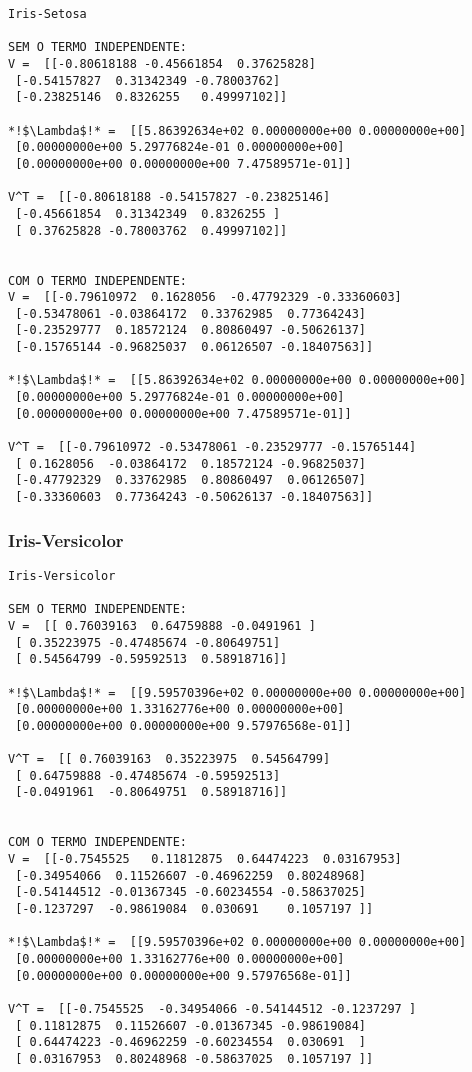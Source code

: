 \documentclass[a4paper,12pt,twoside]{article}
\begin{document}
\begin{lstlisting}
Iris-Setosa

SEM O TERMO INDEPENDENTE: 
V =  [[-0.80618188 -0.45661854  0.37625828]
 [-0.54157827  0.31342349 -0.78003762]
 [-0.23825146  0.8326255   0.49997102]]

*!$\Lambda$!* =  [[5.86392634e+02 0.00000000e+00 0.00000000e+00]
 [0.00000000e+00 5.29776824e-01 0.00000000e+00]
 [0.00000000e+00 0.00000000e+00 7.47589571e-01]]

V^T =  [[-0.80618188 -0.54157827 -0.23825146]
 [-0.45661854  0.31342349  0.8326255 ]
 [ 0.37625828 -0.78003762  0.49997102]]


COM O TERMO INDEPENDENTE: 
V =  [[-0.79610972  0.1628056  -0.47792329 -0.33360603]
 [-0.53478061 -0.03864172  0.33762985  0.77364243]
 [-0.23529777  0.18572124  0.80860497 -0.50626137]
 [-0.15765144 -0.96825037  0.06126507 -0.18407563]]

*!$\Lambda$!* =  [[5.86392634e+02 0.00000000e+00 0.00000000e+00]
 [0.00000000e+00 5.29776824e-01 0.00000000e+00]
 [0.00000000e+00 0.00000000e+00 7.47589571e-01]]

V^T =  [[-0.79610972 -0.53478061 -0.23529777 -0.15765144]
 [ 0.1628056  -0.03864172  0.18572124 -0.96825037]
 [-0.47792329  0.33762985  0.80860497  0.06126507]
 [-0.33360603  0.77364243 -0.50626137 -0.18407563]]

\end{lstlisting}

\subsubsection{Iris-Versicolor}

\begin{lstlisting}
Iris-Versicolor

SEM O TERMO INDEPENDENTE: 
V =  [[ 0.76039163  0.64759888 -0.0491961 ]
 [ 0.35223975 -0.47485674 -0.80649751]
 [ 0.54564799 -0.59592513  0.58918716]]

*!$\Lambda$!* =  [[9.59570396e+02 0.00000000e+00 0.00000000e+00]
 [0.00000000e+00 1.33162776e+00 0.00000000e+00]
 [0.00000000e+00 0.00000000e+00 9.57976568e-01]]

V^T =  [[ 0.76039163  0.35223975  0.54564799]
 [ 0.64759888 -0.47485674 -0.59592513]
 [-0.0491961  -0.80649751  0.58918716]]


COM O TERMO INDEPENDENTE: 
V =  [[-0.7545525   0.11812875  0.64474223  0.03167953]
 [-0.34954066  0.11526607 -0.46962259  0.80248968]
 [-0.54144512 -0.01367345 -0.60234554 -0.58637025]
 [-0.1237297  -0.98619084  0.030691    0.1057197 ]]

*!$\Lambda$!* =  [[9.59570396e+02 0.00000000e+00 0.00000000e+00]
 [0.00000000e+00 1.33162776e+00 0.00000000e+00]
 [0.00000000e+00 0.00000000e+00 9.57976568e-01]]

V^T =  [[-0.7545525  -0.34954066 -0.54144512 -0.1237297 ]
 [ 0.11812875  0.11526607 -0.01367345 -0.98619084]
 [ 0.64474223 -0.46962259 -0.60234554  0.030691  ]
 [ 0.03167953  0.80248968 -0.58637025  0.1057197 ]]
\end{lstlisting}
\end{document}
